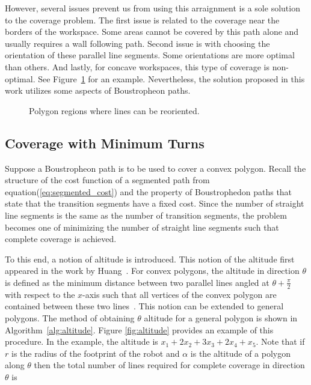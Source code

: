 \documentclass[../main.tex]{subfiles}
\begin{document}
However, several issues prevent us from using this arraignment is a sole solution to the coverage problem. The first issue is related to the coverage near the borders of the workspace. Some areas cannot be covered by this path alone and usually requires a wall following path. Second issue is with choosing the orientation of these parallel line segments. Some orientations are more optimal than others. And lastly, for concave workspaces, this type of coverage is non-optimal. See Figure~\ref{fig:reorder_regions} for an example. Nevertheless, the solution proposed in this work utilizes some aspects of Boustropheon paths.

\begin{figure}
	\centering
	\begin{subfigure}{0.5\linewidth}
		\centering
		
	\end{subfigure}%
	\begin{subfigure}{0.5\linewidth}
		\centering
		
	\end{subfigure}
	\caption{Polygon regions where lines can be reoriented.}
	\label{fig:reorder_regions}
\end{figure}


\subsection{Coverage with Minimum Turns}
\label{subsection:coverage_with_minimum_turns}

Suppose a Boustropheon path is to be used to cover a convex polygon. Recall the structure of the cost function of a segmented path from equation(\ref{eq:segmented_cost}) and the property of Boustrophedon paths that state that the transition segments have a fixed cost. Since the number of straight line segments is the same as the number of transition segments, the problem becomes one of minimizing the number of straight line segments such that complete coverage is achieved.

To this end, a notion of altitude is introduced. This notion of the altitude first appeared in the work by Huang~\cite{Huang2001optimal}. For convex polygons, the altitude in direction $\theta$ is defined as the minimum distance between two parallel lines angled at $\theta+\frac{\pi}{2}$ with respect to the $x$-axis such that all vertices of the convex polygon are contained between these two lines~\cite{Huang2001optimal}. This notion can be extended to general polygons. The method of obtaining $\theta$ altitude for a general polygon is shown in Algorithm~\ref{alg:altitude}. Figure \ref{fig:altitude} provides an example of this procedure. In the example, the altitude is $x_1 + 2x_2 + 3x_3 + 2x_4 + x_5$. Note that if $r$ is the radius of the footprint of the robot and $\alpha$ is the altitude of a polygon along $\theta$ then the total number of lines required for complete coverage in direction $\theta$ is
\end{document}
